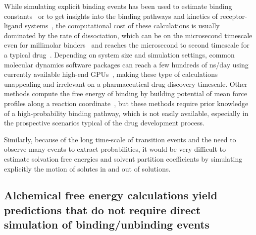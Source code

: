 \documentclass[9pt,bestpractices]{livecoms}
\begin{document}
While simulating explicit binding events has been used to estimate binding constants~\cite{jong2011determining,pan2017quantitative} or to get insights into the binding pathways and kinetics of receptor-ligand systems~\cite{teo2016adaptive,votapka2017seekr,doerr2014onthefly,plattner2015protein,dixon2018predicting}, the computational cost of these calculations is usually dominated by the rate of dissociation, which can be on the microsecond timescale even for millimolar binders~\cite{pan2017quantitative} and reaches the microsecond to second timescale for a typical drug~\cite{basavapathruni2012conformational,hyre2006cooperative}.
Depending on system size and simulation settings, common molecular dynamics software packages can reach a few hundreds of ns/day using currently available high-end GPUs~\cite{eastman2017openmm,kutzner2019more}, making these type of calculations unappealing and irrelevant on a pharmaceutical drug discovery timescale.
Other methods compute the free energy of binding by building potential of mean force profiles along a reaction coordinate~\cite{woo2005calculation,velez-vega2013overcoming,limongelli2013funnel,heinzelmann2017attachpullrelease}, but these methods require prior knowledge of a high-probability binding pathway, which is not easily available, especially in the prospective scenarios typical of the drug development process.

Similarly, because of the long time-scale of transition events and the need to observe many events to extract probabilities, it would be very difficult to estimate solvation free energies and solvent partition coefficients by simulating explicitly the motion of solutes in and out of solutions.

\subsection{Alchemical free energy calculations yield predictions that do not require direct simulation of binding/unbinding events}
\end{document}
